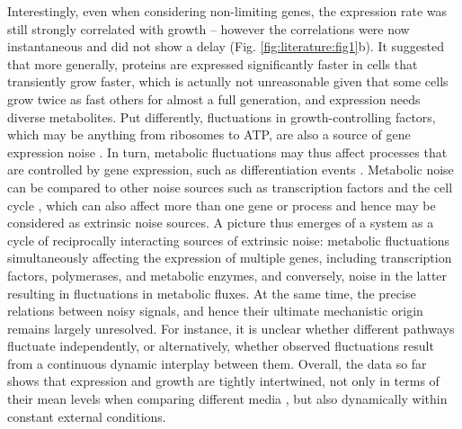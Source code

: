 Interestingly, even when considering non-limiting genes, the expression rate was still strongly correlated with growth – however the correlations were now instantaneous and did not show a delay (Fig. \ref{fig:literature:fig1}b). It suggested that more generally, proteins are expressed significantly faster in cells that transiently grow faster, which is actually not unreasonable given that some cells grow twice as fast others for almost a full generation, and expression needs diverse metabolites. Put differently, fluctuations in growth-controlling factors, which may be anything from ribosomes to ATP, are also a source of gene expression noise \cite{Tsuru2009}. In turn, metabolic fluctuations may thus affect processes that are controlled by gene expression, such as differentiation events \cite{Balazsi2011, Maamar2005}. Metabolic noise can be compared to other noise sources such as transcription factors \cite{Elowitz2002} and the cell cycle \cite{Walker2016}, which can also affect more than one gene or process and hence may be considered as extrinsic noise sources. A picture thus emerges of a system as a cycle of reciprocally interacting sources of extrinsic noise: metabolic fluctuations simultaneously affecting the expression of multiple genes, including transcription factors, polymerases, and metabolic enzymes, and conversely, noise in the latter resulting in fluctuations in metabolic fluxes. At the same time, the precise relations between noisy signals, and hence their ultimate mechanistic origin remains largely unresolved. For instance, it is unclear whether different pathways fluctuate independently, or alternatively, whether observed fluctuations result from a continuous dynamic interplay between them. Overall, the data so far shows that expression and growth are tightly intertwined, not only in terms of their mean levels when comparing different media \cite{Scott2010}, but also dynamically within constant external conditions. 

